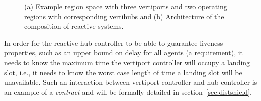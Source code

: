 \begin{figure}[h!]
    \centering

\caption{(a) Example region space with three vertiports and two operating regions with corresponding vertihubs and (b) Architecture of the composition of reactive systems. }
\label{fig:dist_shield}
\end{figure}
In order for the reactive hub controller to be able to guarantee liveness properties, such as an upper bound on delay for all agents (a requirement), it needs to know the maximum time the vertiport controller will occupy a landing slot, i.e., it needs to know the worst case length of time a landing slot will be unavailable. 
Such an interaction between vertiport controller and hub controller is an example of a \emph{contract} and will be formally detailed in section~\ref{sec:distshield}.

